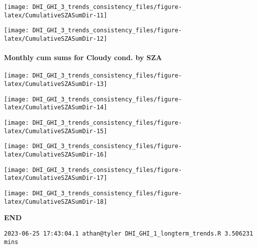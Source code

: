 \documentclass[
  10pt,
  a4paper,oneside]{article}
\begin{document}
\begin{center}\texttt{[image: DHI\_GHI\_3\_trends\_consistency\_files/figure-latex/CumulativeSZASumDir-11]} \end{center}

\begin{center}\texttt{[image: DHI\_GHI\_3\_trends\_consistency\_files/figure-latex/CumulativeSZASumDir-12]} \end{center}

\newpage

\FloatBarrier

\hypertarget{monthly-cum-sums-for-cloudy-cond.-by-sza-1}{%
\paragraph{Monthly cum sums for Cloudy cond. by SZA}\label{monthly-cum-sums-for-cloudy-cond.-by-sza-1}}

\begin{center}\texttt{[image: DHI\_GHI\_3\_trends\_consistency\_files/figure-latex/CumulativeSZASumDir-13]} \end{center}

\begin{center}\texttt{[image: DHI\_GHI\_3\_trends\_consistency\_files/figure-latex/CumulativeSZASumDir-14]} \end{center}

\begin{center}\texttt{[image: DHI\_GHI\_3\_trends\_consistency\_files/figure-latex/CumulativeSZASumDir-15]} \end{center}

\begin{center}\texttt{[image: DHI\_GHI\_3\_trends\_consistency\_files/figure-latex/CumulativeSZASumDir-16]} \end{center}

\begin{center}\texttt{[image: DHI\_GHI\_3\_trends\_consistency\_files/figure-latex/CumulativeSZASumDir-17]} \end{center}

\begin{center}\texttt{[image: DHI\_GHI\_3\_trends\_consistency\_files/figure-latex/CumulativeSZASumDir-18]} \end{center}

\textbf{END}

\begin{verbatim}
2023-06-25 17:43:04.1 athan@tyler DHI_GHI_1_longterm_trends.R 3.506231 mins
\end{verbatim}
\end{document}
